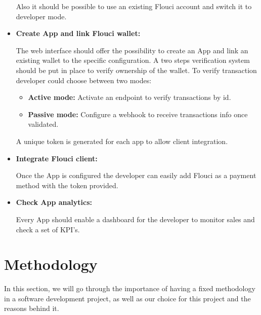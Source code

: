 \begin{spacing}{1.2}
\begin{itemize}
  Also it should be possible to use an existing Flouci account and switch it to developer mode.
   
  \item \textbf{Create App and link Flouci wallet:}

  The web interface should offer the possibility to create an App and link an existing wallet to the specific configuration. A two steps verification system should be put in place to verify ownership of the wallet.
  To verify transaction developer could choose between two modes:
  \begin{itemize}
  \item \textbf{Active mode:} Activate an endpoint to verify transactions by id.
  \item \textbf{Passive mode:} Configure a webhook to receive transactions info once validated.
   \end{itemize}
   A unique token is generated for each app to allow client integration.
  \item \textbf{Integrate Flouci client:}
 
 Once the App is configured the developer can easily add Flouci as a payment method with the token provided.
  \item \textbf{Check App analytics:}
  
  Every App should enable a dashboard for the developer to monitor sales and check a set of KPI's.
\end{itemize}
\section{Methodology}

In this section, we will go through the importance of having a fixed methodology in a software development project, as well as our choice for this project and the reasons behind it. 

\end{spacing}
